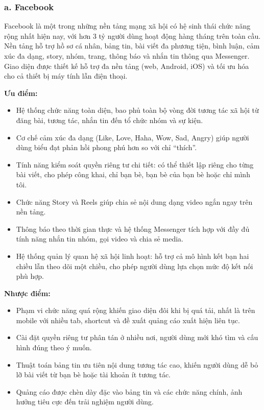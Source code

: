 \documentclass[../DoAn.tex]{subfiles}
\begin{document}
\subsubsection*{a. Facebook}
Facebook là một trong những nền tảng mạng xã hội có hệ sinh thái chức năng rộng nhất hiện nay, với hơn 3 tỷ người dùng hoạt động hàng tháng trên toàn cầu. Nền tảng hỗ trợ hồ sơ cá nhân, bảng tin, bài viết đa phương tiện, bình luận, cảm xúc đa dạng, story, nhóm, trang, thông báo và nhắn tin thông qua Messenger. Giao diện được thiết kế hỗ trợ đa nền tảng (web, Android, iOS) và tối ưu hóa cho cả thiết bị máy tính lẫn điện thoại.

\noindent\textbf{Ưu điểm:}
\begin{itemize}
    \item Hệ thống chức năng toàn diện, bao phủ toàn bộ vòng đời tương tác xã hội từ đăng bài, tương tác, nhắn tin đến tổ chức nhóm và sự kiện.
    \item Cơ chế cảm xúc đa dạng (Like, Love, Haha, Wow, Sad, Angry) giúp người dùng biểu đạt phản hồi phong phú hơn so với chỉ ``thích''.
    \item Tính năng kiểm soát quyền riêng tư chi tiết: có thể thiết lập riêng cho từng bài viết, cho phép công khai, chỉ bạn bè, bạn bè của bạn bè hoặc chỉ mình tôi.
    \item Chức năng Story và Reels giúp chia sẻ nội dung dạng video ngắn ngay trên nền tảng.
    \item Thông báo theo thời gian thực và hệ thống Messenger tích hợp với đầy đủ tính năng nhắn tin nhóm, gọi video và chia sẻ media.
    \item Hệ thống quản lý quan hệ xã hội linh hoạt: hỗ trợ cả mô hình kết bạn hai chiều lẫn theo dõi một chiều, cho phép người dùng lựa chọn mức độ kết nối phù hợp.
\end{itemize}

\noindent\textbf{Nhược điểm:}
\begin{itemize}
    \item Phạm vi chức năng quá rộng khiến giao diện đôi khi bị quá tải, nhất là trên mobile với nhiều tab, shortcut và đề xuất quảng cáo xuất hiện liên tục.
    \item Cài đặt quyền riêng tư phân tán ở nhiều nơi, người dùng mới khó tìm và cấu hình đúng theo ý muốn.
    \item Thuật toán bảng tin ưu tiên nội dung tương tác cao, khiến người dùng dễ bỏ lỡ bài viết từ bạn bè hoặc tài khoản ít tương tác.
    \item Quảng cáo được chèn dày đặc vào bảng tin và các chức năng chính, ảnh hưởng tiêu cực đến trải nghiệm người dùng.
\end{itemize}
\end{document}
